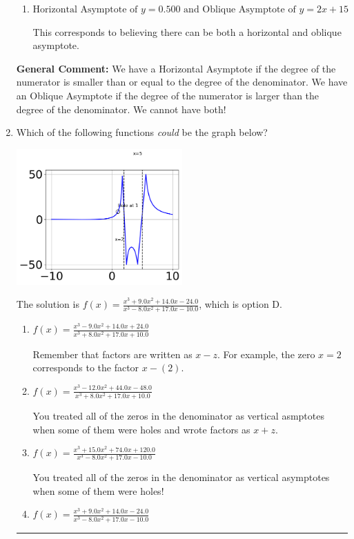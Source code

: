 \documentclass{extbook}[14pt]
\newcommand{\litem}[1]{\item #1

\rule{\textwidth}{0.4pt}}
\begin{document}
\begin{enumerate}
{\begin{enumerate}[label=\Alph*.]
This corresponds to using rule for Horizontal Asymptote when degree of numerator and denominator match.
\item \( \text{Horizontal Asymptote of } y = 0.500 \text{ and Oblique Asymptote of } y = 2x + 15 \)

This corresponds to believing there can be both a horizontal and oblique asymptote.
\end{enumerate}

\textbf{General Comment:} We have a Horizontal Asymptote if the degree of the numerator is smaller than or equal to the degree of the denominator. We have an Oblique Asymptote if the degree of the numerator is larger than the degree of the denominator. We cannot have both!
}
\litem{
Which of the following functions \textit{could} be the graph below?

\begin{center}
    \includegraphics[width=0.5\textwidth]{../Figures/identifyGraphOfRationalFunctionB.png}
\end{center}


The solution is \( f(x)=\frac{x^{3} +9.0 x^{2} +14.0 x -24.0}{x^{3} -8.0 x^{2} +17.0 x -10.0} \), which is option D.\begin{enumerate}[label=\Alph*.]
\item \( f(x)=\frac{x^{3} -9.0 x^{2} +14.0 x + 24.0}{x^{3} +8.0 x^{2} +17.0 x + 10.0} \)

Remember that factors are written as $x-z$. For example, the zero $x=2$ corresponds to the factor $x-(2)$.
\item \( f(x)=\frac{x^{3} -12.0 x^{2} +44.0 x -48.0}{x^{3} +8.0 x^{2} +17.0 x + 10.0} \)

You treated all of the zeros in the denominator as vertical asmptotes when some of them were holes and wrote factors as $x+z$.
\item \( f(x)=\frac{x^{3} +15.0 x^{2} +74.0 x + 120.0}{x^{3} -8.0 x^{2} +17.0 x -10.0} \)

You treated all of the zeros in the denominator as vertical asymptotes when some of them were holes!
\item \( f(x)=\frac{x^{3} +9.0 x^{2} +14.0 x -24.0}{x^{3} -8.0 x^{2} +17.0 x -10.0} \)


\end{enumerate}}
\end{enumerate}
\end{document}
